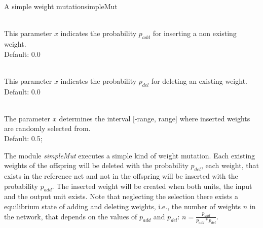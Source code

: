\begin{moduledoc}{A simple weight mutation}{simpleMut}

\item[\KeyWord{probadd} \optParam{$p_{add}$}]~\\
This parameter $x$ indicates the probability $p_{add}$ for inserting a
non existing weight.\\
Default: 0.0

\item[\KeyWord{probdel} \optParam{$p_{del}$}]~\\
This parameter $x$ indicates the probability $p_{del}$ for deleting an
existing weight.\\
Default: 0.0

\item[\KeyWord{initRange} \optParam{f}]~\\
The parameter $x$ determines the interval  [-range, range] where
inserted weights are randomly selected from.\\
Default: 0.5;

\end{moduledoc}

The module {\it simpleMut} executes a simple kind of weight mutation. 
Each existing weights of the offspring will be deleted with the probability
$p_{del}$, each weight, that exists in the reference net and not in the offspring 
will be inserted with the probability $p_{add}$.
The inserted weight will be created when both units, the input and the output unit 
exists.
Note that neglecting the selection there exists a equilibrium state of
adding and deleting weights, i.e.,
the number of weights $n$ in the network, that depends
on the values of $p_{add}$ and $p_{del}$:  $n = \frac{p_{add}}{p_{add}*p_{del}} $.













